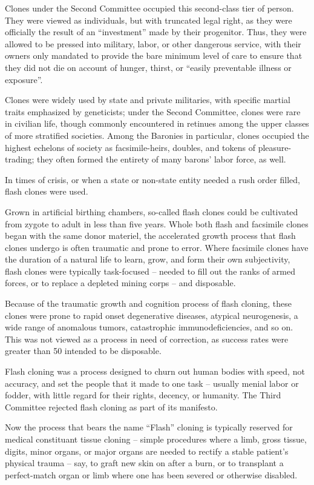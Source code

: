 Clones under the Second Committee occupied this second-class tier of person. They were
viewed as individuals, but with truncated legal right, as they were officially the result of an
``investment'' made by their progenitor. Thus, they were allowed to be pressed into military, labor,
or other dangerous service, with their owners only mandated to provide the bare minimum level
of care to ensure that they did not die on account of hunger, thirst, or ``easily preventable illness
or exposure''.

Clones were widely used by state and private militaries, with specific martial traits emphasized
by geneticists; under the Second Committee, clones were rare in civilian life, though commonly
encountered in retinues among the upper classes of more stratified societies. Among the
Baronies in particular, clones occupied the highest echelons of society as facsimile-heirs,
doubles, and tokens of pleasure-trading; they often formed the entirety of many barons' labor
force, as well.

In times of crisis, or when a state or non-state entity needed a rush order filled, flash clones were
used.

Grown in artificial birthing chambers, so-called flash clones could be cultivated from zygote to
adult in less than five years. Whole both flash and facsimile clones began with the same donor
materiel, the accelerated growth process that flash clones undergo is often traumatic and prone
to error. Where facsimile clones have the duration of a natural life to learn, grow, and form their
own subjectivity, flash clones were typically task-focused -- needed to fill out the ranks of armed
forces, or to replace a depleted mining corps -- and disposable.

Because of the traumatic growth and cognition process of flash cloning, these clones were prone
to rapid onset degenerative diseases, atypical neurogenesis, a wide range of anomalous tumors,
catastrophic immunodeficiencies, and so on. This was not viewed as a process in need of
correction, as success rates were greater than 50%
intended to be disposable.

Flash cloning was a process designed to churn out human bodies with speed, not accuracy, and
set the people that it made to one task -- usually menial labor or fodder, with little regard for their
rights, decency, or humanity. The Third Committee rejected flash cloning as part of its manifesto.

Now the process that bears the name ``Flash'' cloning is typically reserved for medical
constituant tissue cloning -- simple procedures where a limb, gross tissue, digits, minor organs,
or major organs are needed to rectify a stable patient's physical trauma -- say, to graft new skin
on after a burn, or to transplant a perfect-match organ or limb where one has been severed or
otherwise disabled.

